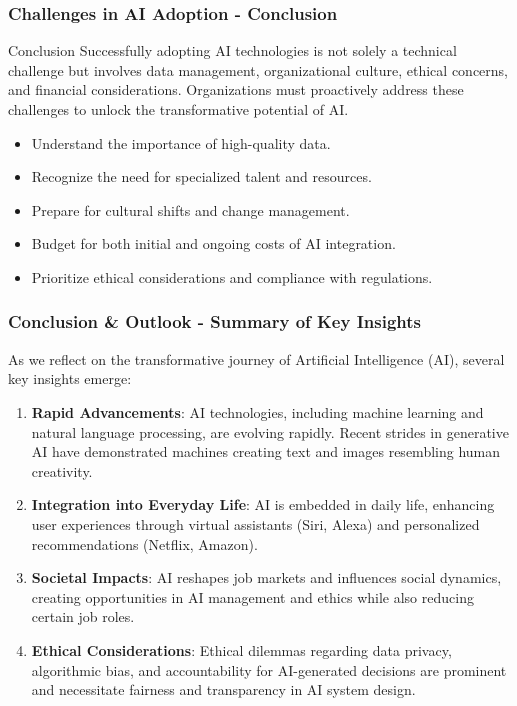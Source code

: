 \documentclass{beamer}
\begin{document}
\begin{frame}[fragile]
    \frametitle{Challenges in AI Adoption - Conclusion}
    \begin{block}{Conclusion}
        Successfully adopting AI technologies is not solely a technical challenge but involves data management, organizational culture, ethical concerns, and financial considerations. 
        Organizations must proactively address these challenges to unlock the transformative potential of AI.
    \end{block}
    
    \begin{itemize}
        \item Understand the importance of high-quality data.
        \item Recognize the need for specialized talent and resources.
        \item Prepare for cultural shifts and change management.
        \item Budget for both initial and ongoing costs of AI integration.
        \item Prioritize ethical considerations and compliance with regulations.
    \end{itemize}
\end{frame}

\begin{frame}[fragile]
    \frametitle{Conclusion \& Outlook - Summary of Key Insights}
    
    As we reflect on the transformative journey of Artificial Intelligence (AI), several key insights emerge:
    
    \begin{enumerate}
        \item \textbf{Rapid Advancements}: 
            AI technologies, including machine learning and natural language processing, are evolving rapidly. Recent strides in generative AI have demonstrated machines creating text and images resembling human creativity.
        
        \item \textbf{Integration into Everyday Life}: 
            AI is embedded in daily life, enhancing user experiences through virtual assistants (Siri, Alexa) and personalized recommendations (Netflix, Amazon).
        
        \item \textbf{Societal Impacts}: 
            AI reshapes job markets and influences social dynamics, creating opportunities in AI management and ethics while also reducing certain job roles.
        
        \item \textbf{Ethical Considerations}: 
            Ethical dilemmas regarding data privacy, algorithmic bias, and accountability for AI-generated decisions are prominent and necessitate fairness and transparency in AI system design.
    \end{enumerate}
\end{frame}
\end{document}
